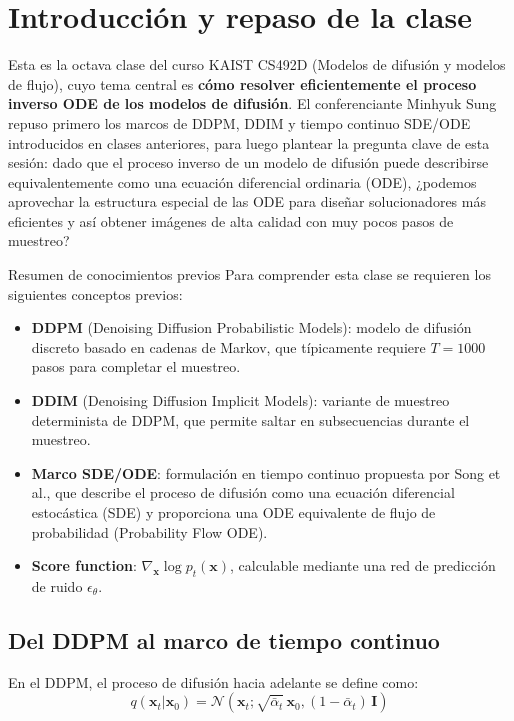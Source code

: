 \section{Introducción y repaso de la clase}

Esta es la octava clase del curso KAIST CS492D (Modelos de difusión y modelos de flujo), cuyo tema central es \textbf{cómo resolver eficientemente el proceso inverso ODE de los modelos de difusión}. El conferenciante Minhyuk Sung repuso primero los marcos de DDPM, DDIM y tiempo continuo SDE/ODE introducidos en clases anteriores, para luego plantear la pregunta clave de esta sesión: dado que el proceso inverso de un modelo de difusión puede describirse equivalentemente como una ecuación diferencial ordinaria (ODE), ¿podemos aprovechar la estructura especial de las ODE para diseñar solucionadores más eficientes y así obtener imágenes de alta calidad con muy pocos pasos de muestreo?

\begin{knowledgebox}{Resumen de conocimientos previos}
Para comprender esta clase se requieren los siguientes conceptos previos:
\begin{itemize}
    \item \textbf{DDPM} (Denoising Diffusion Probabilistic Models): modelo de difusión discreto basado en cadenas de Markov, que típicamente requiere $T=1000$ pasos para completar el muestreo.
    \item \textbf{DDIM} (Denoising Diffusion Implicit Models): variante de muestreo determinista de DDPM, que permite saltar en subsecuencias durante el muestreo.
    \item \textbf{Marco SDE/ODE}: formulación en tiempo continuo propuesta por Song et al., que describe el proceso de difusión como una ecuación diferencial estocástica (SDE) y proporciona una ODE equivalente de flujo de probabilidad (Probability Flow ODE).
    \item \textbf{Score function}: $\nabla_{\mathbf{x}} \log p_t(\mathbf{x})$, calculable mediante una red de predicción de ruido $\epsilon_\theta$.
\end{itemize}
\end{knowledgebox}

\subsection{Del DDPM al marco de tiempo continuo}

En el DDPM, el proceso de difusión hacia adelante se define como:
$$q(\mathbf{x}_t | \mathbf{x}_0) = \mathcal{N}(\mathbf{x}_t; \sqrt{\bar{\alpha}_t}\, \mathbf{x}_0, (1 - \bar{\alpha}_t)\, \mathbf{I})$$

